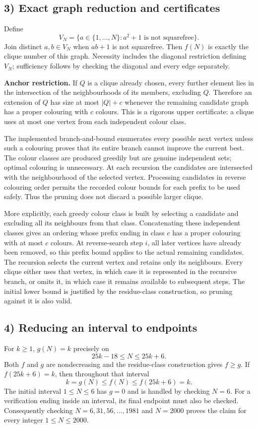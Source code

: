 \subsection*{3) Exact graph reduction and certificates}
Define
\[
V_N=\{a\in\{1,\ldots,N\}:a^2+1\text{ is not squarefree}\}.
\]
Join distinct $a,b\in V_N$ when $ab+1$ is not squarefree. Then $f(N)$ is exactly the clique number of this graph. Necessity includes the diagonal restriction defining $V_N$; sufficiency follows by checking the diagonal and every edge separately.

\textbf{Anchor restriction.} If $Q$ is a clique already chosen, every further element lies in the intersection of the neighbourhoods of its members, excluding $Q$. Therefore an extension of $Q$ has size at most $|Q|+c$ whenever the remaining candidate graph has a proper colouring with $c$ colours. This is a rigorous upper certificate: a clique uses at most one vertex from each independent colour class.

The implemented branch-and-bound enumerates every possible next vertex unless such a colouring proves that its entire branch cannot improve the current best. The colour classes are produced greedily but are genuine independent sets; optimal colouring is unnecessary. At each recursion the candidates are intersected with the neighbourhood of the selected vertex. Processing candidates in reverse colouring order permits the recorded colour bounds for each prefix to be used safely. Thus the pruning does not discard a possible larger clique.

More explicitly, each greedy colour class is built by selecting a candidate and excluding all its neighbours from that class. Concatenating these independent classes gives an ordering whose prefix ending in class $c$ has a proper colouring with at most $c$ colours. At reverse-search step $i$, all later vertices have already been removed, so this prefix bound applies to the actual remaining candidates. The recursion selects the current vertex and retains only its neighbours. Every clique either uses that vertex, in which case it is represented in the recursive branch, or omits it, in which case it remains available to subsequent steps. The initial lower bound is justified by the residue-class construction, so pruning against it is also valid.

\subsection*{4) Reducing an interval to endpoints}
For $k\geq1$, $g(N)=k$ precisely on
\[
25k-18\leq N\leq25k+6.
\]
Both $f$ and $g$ are nondecreasing and the residue-class construction gives $f\geq g$. If $f(25k+6)=k$, then throughout that interval
\[
k=g(N)\leq f(N)\leq f(25k+6)=k.
\]
The initial interval $1\leq N\leq6$ has $g=0$ and is handled by checking $N=6$. For a verification ending inside an interval, its final endpoint must also be checked. Consequently checking $N=6,31,56,\ldots,1981$ and $N=2000$ proves the claim for every integer $1\leq N\leq2000$.

